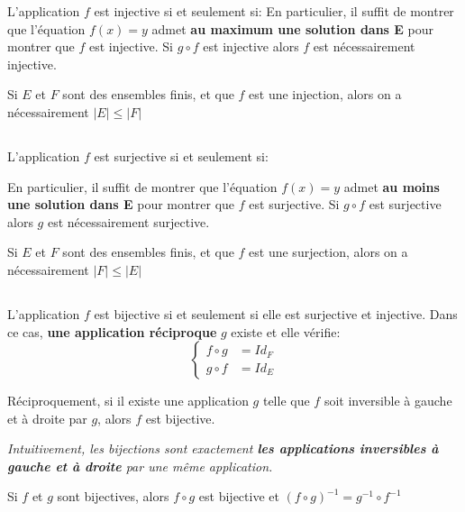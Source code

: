 L'application \(f\) est injective si et seulement si:
En particulier, il suffit de montrer que l'équation \(f(x) = y\) admet \textbf{au maximum une solution dans E} pour montrer que \(f\) est injective.\+
Si \(g \circ f\) est injective alors \(f\) est nécessairement injective.\<

Si \(E\) et \(F\) sont des ensembles finis, et que \(f\) est une injection, alors on a nécessairement \(|E| \leq |F|\)

\subsection*{}

L'application \(f\) est surjective si et seulement si:

En particulier, il suffit de montrer que l'équation \(f(x) = y\) admet \textbf{au moins une solution dans E} pour montrer que \(f\) est surjective.\+
Si \(g \circ f\) est surjective alors \(g\) est nécessairement surjective.\<

Si \(E\) et \(F\) sont des ensembles finis, et que \(f\) est une surjection, alors on a nécessairement \(|F| \leq |E|\)

\subsection*{}

L'application \(f\) est bijective si et seulement si elle est surjective et injective.\+  
Dans ce cas, \textbf{une application réciproque} \(g\) existe et elle vérifie:
\[
    \begin{cases}
        f \circ g &= Id_F \\
        g \circ f &= Id_E
    \end{cases}
\]


Réciproquement, si il existe une application \(g\) telle que \(f\) soit inversible à gauche et à droite par \(g\), alors \(f\) est bijective.
\begin{center}
    \textit{
        Intuitivement, les bijections sont exactement \textbf{les applications inversibles à gauche et à droite} par une même application.
    }
\end{center}
Si \(f\) et \(g\) sont bijectives, alors \(f \circ g\) est bijective et \((f \circ g)^{-1} = g^{-1} \circ f^{-1}\)

